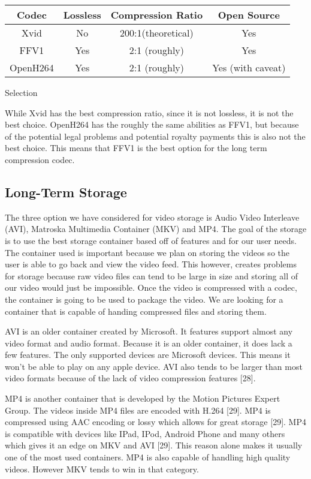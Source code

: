 \documentclass[letterpaper,10pt,onecolumn,draftclsnofoot]{IEEEtran}
\begin{document}
\begin{center}
	\begin{tabular}{|c|c|c|c|}
		\hline
		\textbf{Codec} & \textbf{Lossless} & \textbf{Compression Ratio} & \textbf{Open Source} \\
		\hline
		Xvid & No & 200:1(theoretical) & Yes \\
		\hline
		FFV1 & Yes & 2:1 (roughly) & Yes \\
		\hline
		OpenH264 & Yes & 2:1 (roughly) & Yes (with caveat) \\
		\hline
		
	\end{tabular}
\end{center}

Selection

While Xvid has the best compression ratio, since it is not lossless, it is not the best choice.
OpenH264 has the roughly the same abilities as FFV1, but because of the potential legal problems and potential royalty payments this is also not the best choice.
This means that FFV1 is the best option for the long term compression codec.

\newpage
\subsection{Long-Term Storage} %

The three option we have considered for video storage is Audio Video Interleave (AVI), Matroska Multimedia Container (MKV) and MP4.
The goal of the storage is to use the best storage container based off of features and for our user needs.
The container used is important because we plan on storing the videos so the user is able to go back and view the video feed.
This however, creates problems for storage because raw video files can tend to be large in size and storing all of our video would just be impossible.
Once the video is compressed with a codec, the container is going to be used to package the video.
We are looking for a container that is capable of handing compressed files and storing them.

AVI is an older container created by Microsoft. It features support almost any video format and audio format.
Because it is an older container, it does lack a few features.
The only supported devices are Microsoft devices.
This means it won't be able to play on any apple device.
AVI also tends to be larger than most video formats because of the lack of video compression features [28].

MP4 is another container that is developed by the Motion Pictures Expert Group.
The videos inside MP4 files are encoded with H.264 [29].
MP4 is compressed using AAC encoding or lossy which allows for great storage [29].
MP4 is compatible with devices like IPad, IPod, Android Phone and many others which gives it an edge on MKV and AVI [29].
This reason alone makes it usually one of the most used containers.
MP4 is also capable of handling high quality videos.
However MKV tends to win in that category.
\end{document}
